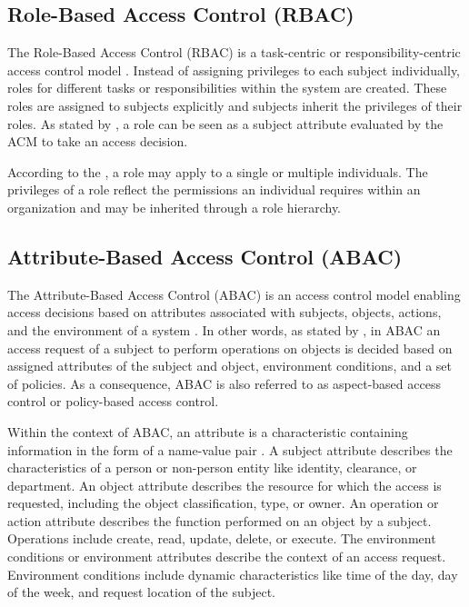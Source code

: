 \subsection{Role-Based Access Control (RBAC)}
The Role-Based Access Control (RBAC) is a task-centric or responsibility-centric access control model \cite{Eckert2023}.
Instead of assigning privileges to each subject individually, roles for different tasks or responsibilities within the system are created.
These roles are assigned to subjects explicitly and subjects inherit the privileges of their roles.
As stated by \citeauthor{Hu2014} \cite{Hu2014}, a role can be seen as a subject attribute evaluated by the ACM to take an access decision.

According to the \citeauthor{JTF2020} \cite{JTF2020}, a role may apply to a single or multiple individuals.
The privileges of a role reflect the permissions an individual requires within an organization and may be inherited through a role hierarchy.

\subsection{Attribute-Based Access Control (ABAC)}
The Attribute-Based Access Control (ABAC) is an access control model enabling access decisions based on attributes associated with subjects, objects, actions, and the environment of a system \cite{JTF2020}.
In other words, as stated by \citeauthor{Hu2014} \cite{Hu2014}, in ABAC an access request of a subject to perform operations on objects is decided based on assigned attributes of the subject and object, environment conditions, and a set of policies.
As a consequence, ABAC is also referred to as aspect-based access control \cite{Anderson2020} or policy-based access control.

Within the context of ABAC, an attribute is a characteristic containing information in the form of a name-value pair \cite{Hu2014}.
A subject attribute describes the characteristics of a person or non-person entity like identity, clearance, or department.
An object attribute describes the resource for which the access is requested, including the object classification, type, or owner.
An operation or action attribute describes the function performed on an object by a subject.
Operations include create, read, update, delete, or execute.
The environment conditions or environment attributes describe the context of an access request.
Environment conditions include dynamic characteristics like time of the day, day of the week, and request location of the subject.


